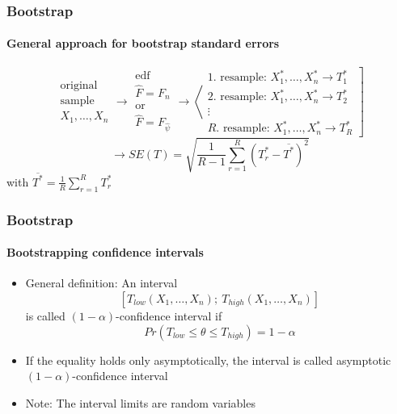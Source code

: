 \documentclass[smaller,compress]{beamer}
\begin{document}
\begin{frame}\frametitle{Bootstrap}\framesubtitle{General approach for bootstrap standard errors}
    \begin{equation*}
    \begin{array}{c}
    \text{original} \\
    \text{sample} \\
    X_{1},\ldots ,X_{n}
    \end{array}
    \longrightarrow
    \begin{array}{c}
    \text{edf} \\
    \hat{F}=F_{n} \\
    \text{or} \\
    \hat{F}=F_{\hat{\psi}}
    \end{array}
    \longrightarrow \left\langle
    \begin{array}{c}
    \text{1. resample: }X_{1}^{\ast },\ldots ,X_{n}^{\ast }\rightarrow T_{1}^{\ast } \\
    \text{2. resample: }X_{1}^{\ast },\ldots ,X_{n}^{\ast }\rightarrow T_{2}^{\ast } \\
    \vdots \qquad \qquad \qquad \qquad \\
    R\text{. resample: }X_{1}^{\ast },\ldots ,X_{n}^{\ast }\rightarrow T_{R}^{\ast }
    \end{array}
    \right]
    \end{equation*}
    \bigskip
    \begin{equation*}
    \longrightarrow SE(T)=\sqrt{\frac{1}{R-1}\sum_{r=1}^{R}\left(T_{r}^{\ast }-\overline{T^{\ast }}\right) ^{2}}
    \end{equation*}
    with $\overline{T^{\ast }} = \frac{1}{R}\sum_{r=1}^{R}T_{r}^{\ast }$
\end{frame}


\begin{frame}\frametitle{Bootstrap}\framesubtitle{Bootstrapping confidence intervals}
\begin{itemize}
    \item General definition: An interval
    \begin{equation*}
    \left[ T_{low}\left( X_{1},\ldots ,X_{n}\right) ;\ T_{high}\left( X_{1},\ldots ,X_{n}\right) \right]
    \end{equation*}
    is called $\left( 1-\alpha \right) $-confidence interval if
    \begin{equation*}
    Pr\left( T_{low}\leq \theta \leq T_{high}\right)=1-\alpha
    \end{equation*}
    \item If the equality holds only asymptotically, the interval is called asymptotic $\left( 1-\alpha \right) $-confidence interval
    \item Note: The interval limits are random variables
\end{itemize}
\end{frame}
\end{document}
